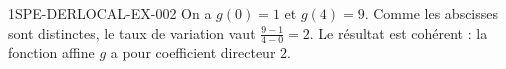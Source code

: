 \begin{corrige}{1SPE-DERLOCAL-EX-002}
On a $g(0)=1$ et $g(4)=9$. Comme les abscisses sont distinctes, le taux de variation vaut $\frac{9-1}{4-0}=2$. Le résultat est cohérent : la fonction affine $g$ a pour coefficient directeur $2$.
\end{corrige}
